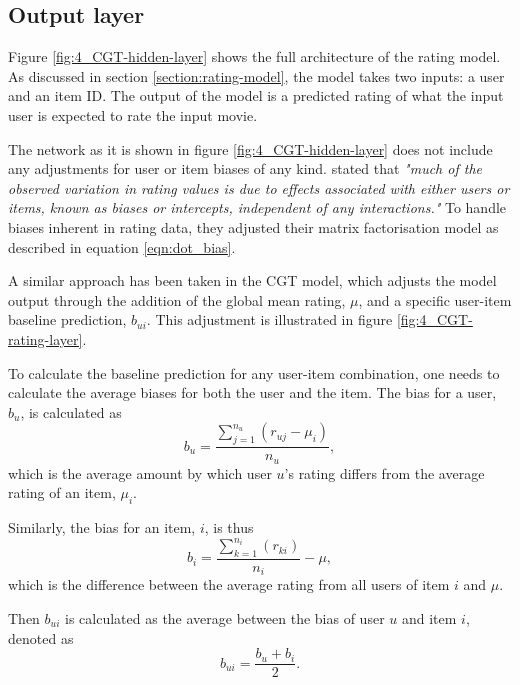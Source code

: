 \subsection{Output layer}
Figure \ref{fig:4_CGT-hidden-layer} shows the full architecture of the rating model. As discussed in section \ref{section:rating-model}, the model takes two inputs: a user and an item ID. The output of the model is a predicted rating of what the input user is expected to rate the input movie. 

The network as it is shown in figure \ref{fig:4_CGT-hidden-layer} does not include any adjustments for user or item biases of any kind. \citeauthor{koren2009matrix} stated that \textit{"much of the observed variation in rating values is due to effects associated with either users or items, known as biases or intercepts, independent of any interactions."} To handle biases inherent in rating data, they adjusted their matrix factorisation model as described in equation \ref{eqn:dot_bias}.

A similar approach has been taken in the CGT model, which adjusts the model output through the addition of the global mean rating, $\mu$, and a specific user-item baseline prediction, $b_{ui}$. This adjustment is illustrated in figure \ref{fig:4_CGT-rating-layer}. 

To calculate the baseline prediction for any user-item combination, one needs to calculate the average biases for both the user and the item. The bias for a user, $b_u$, is calculated as 
\begin{equation}
    b_{u} = \dfrac{\sum_{j=1}^{n_u} (r_{uj} - \mu_i)}{n_u},
\label{eqn:CGT-user-bias}
\end{equation}
which is the average amount by which user $u$'s rating differs from the average rating of an item, $\mu_i$.

Similarly, the bias for an item, $i$, is thus
\begin{equation}
    b_{i} = \dfrac{\sum_{k=1}^{n_i} (r_{ki})}{n_i} - \mu,
\label{eqn:CGT-item-bias}
\end{equation}
which is the difference between the average rating from all users of item $i$ and $\mu$.

Then $b_{ui}$ is calculated as the average between the bias of user $u$ and item $i$, denoted as
\begin{equation}
    b_{ui} = \dfrac{b_u + b_i}{2}.
\label{eqn:CGT-baseline}
\end{equation}

